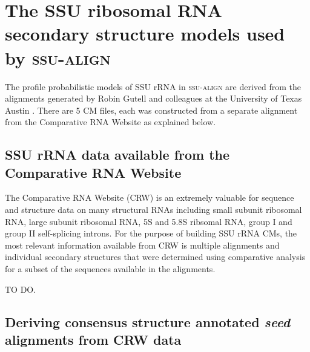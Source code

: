 \section{The SSU ribosomal RNA secondary structure models used by \textsc{ssu-align}}

The profile probabilistic models of SSU rRNA in \textsc{ssu-align} are
derived from the alignments generated by Robin Gutell and colleagues
at the University of Texas Austin \cite{Cannone02}. There are 5 CM
files, each was constructed from a separate alignment from the
Comparative RNA Website as explained below.

\subsection{SSU rRNA data available from the Comparative RNA Website}

The Comparative RNA Website (CRW) is an extremely valuable for
sequence and structure data on many structural RNAs including small
subunit ribosomal RNA, large subunit ribosomal RNA, 5S and 5.8S
ribsomal RNA, group I and group II self-splicing introns. For the
purpose of building SSU rRNA CMs, the most relevant information
available from CRW is multiple alignments and individual secondary
structures that were determined using comparative analysis for a
subset of the sequences available in the alignments. 

TO DO.

\subsection{Deriving consensus structure annotated \emph{seed} alignments from CRW data}


